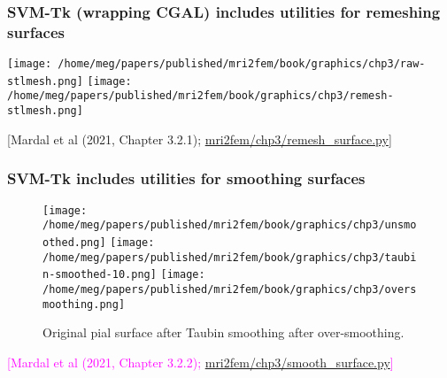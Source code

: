 \documentclass[10pt, mathserif, aspectratio=169, t, usenames, dvipsnames]{beamer}
\newcommand{\refer}[1]{\begin{flushright}{\tiny \textcolor{Cerulean}{[#1]}}\end{flushright}}
\newcommand{\referself}[1]{\begin{flushright}{\tiny \textcolor{Magenta}{[#1]}}\end{flushright}}
\begin{document}
\begin{frame}
  \frametitle{SVM-Tk (wrapping CGAL) includes utilities for remeshing surfaces}
  \centering
  \texttt{[image: /home/meg/papers/published/mri2fem/book/graphics/chp3/raw-stlmesh.png]}
  \texttt{[image: /home/meg/papers/published/mri2fem/book/graphics/chp3/remesh-stlmesh.png]}
  \refer{Mardal et al (2021, Chapter 3.2.1); \href{https://github.com/kent-and/mri2fem/blob/master/mri2fem/mri2fem/chp3/remesh_surface.py}{mri2fem/chp3/remesh\_surface.py}}
\end{frame}

\begin{frame}
  \frametitle{SVM-Tk includes utilities for smoothing surfaces}
  \begin{figure}
  \centering
  \texttt{[image: /home/meg/papers/published/mri2fem/book/graphics/chp3/unsmoothed.png]}
  \texttt{[image: /home/meg/papers/published/mri2fem/book/graphics/chp3/taubin-smoothed-10.png]}
  \texttt{[image: /home/meg/papers/published/mri2fem/book/graphics/chp3/oversmoothing.png]}

  Original pial surface \hspace{3em} after Taubin smoothing \hspace{3em}
after over-smoothing.
  \end{figure}
  \bigskip
  
  \referself{Mardal et al (2021, Chapter 3.2.2); \href{https://github.com/kent-and/mri2fem/blob/master/mri2fem/mri2fem/chp3/smooth_surface.py}{mri2fem/chp3/smooth\_surface.py}}
\end{frame}
\end{document}
